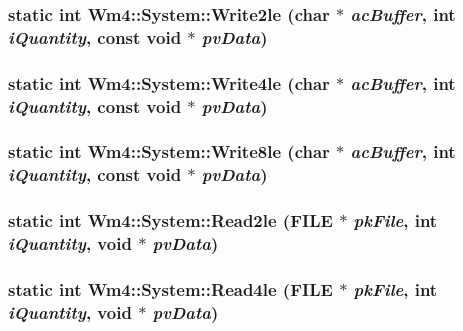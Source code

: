 \subsubsection{\setlength{\rightskip}{0pt plus 5cm}static int Wm4::System::Write2le (char $\ast$ {\em ac\-Buffer}, int {\em i\-Quantity}, const void $\ast$ {\em pv\-Data})\hspace{0.3cm}{\tt  [static]}}\label{classWm4_1_1System_c570e6b935a363025d4868b03bc3add3}


\subsubsection{\setlength{\rightskip}{0pt plus 5cm}static int Wm4::System::Write4le (char $\ast$ {\em ac\-Buffer}, int {\em i\-Quantity}, const void $\ast$ {\em pv\-Data})\hspace{0.3cm}{\tt  [static]}}\label{classWm4_1_1System_c988a64a8106c3576b6633210a3d14f8}


\subsubsection{\setlength{\rightskip}{0pt plus 5cm}static int Wm4::System::Write8le (char $\ast$ {\em ac\-Buffer}, int {\em i\-Quantity}, const void $\ast$ {\em pv\-Data})\hspace{0.3cm}{\tt  [static]}}\label{classWm4_1_1System_b589c5bb09a8147b5dacb2b3eab0cd7e}


\subsubsection{\setlength{\rightskip}{0pt plus 5cm}static int Wm4::System::Read2le (FILE $\ast$ {\em pk\-File}, int {\em i\-Quantity}, void $\ast$ {\em pv\-Data})\hspace{0.3cm}{\tt  [static]}}\label{classWm4_1_1System_26bb4792ee2fd1dce6eda4971f0d6f1a}


\subsubsection{\setlength{\rightskip}{0pt plus 5cm}static int Wm4::System::Read4le (FILE $\ast$ {\em pk\-File}, int {\em i\-Quantity}, void $\ast$ {\em pv\-Data})\hspace{0.3cm}{\tt  [static]}}\label{classWm4_1_1System_dc76d8a490eb3834c5b9dfa48893aa0c}


